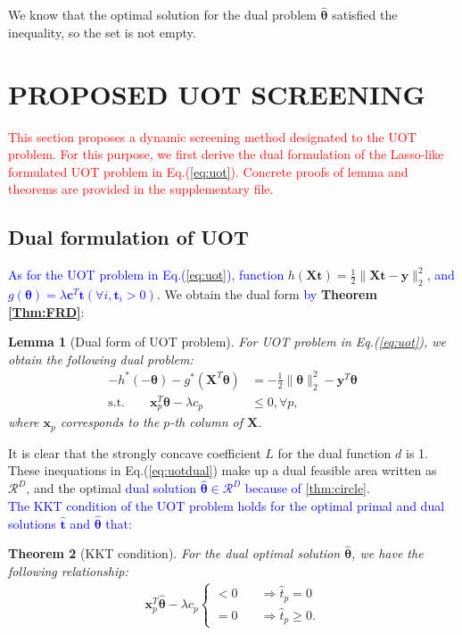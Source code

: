\documentclass[twoside]{article}
\theoremstyle{plain}
\newtheorem{thm}{Theorem}
\newtheorem{lem}[thm]{Lemma}
\newcommand{\tranT}{T}
\newcommand{\mat}[1]{\mathbf{#1}}
\renewcommand{\vec}[1]{\bm{#1}}
\newcommand{\changeHK}[1]{\textcolor{red}{#1}}
\newcommand{\changeXS}[1]{\textcolor{blue}{#1}}
\begin{document}
We know that the optimal solution for the dual problem $\hat{\vec{\theta}}$ satisfied the inequality, so the set is not empty.


\section{PROPOSED UOT SCREENING}
\label{sec:pro}

\changeHK{This section proposes a dynamic screening method designated to the UOT problem. For this purpose, we first derive the dual formulation of the Lasso-like formulated UOT problem in Eq.(\ref{eq:uot}). Concrete proofs of lemma and theorems are provided in the supplementary file.}


\subsection{Dual formulation of UOT}

\changeXS{As for the UOT problem in Eq.(\ref{eq:uot}), function } 
 $h(\mat{X} \vec{t}) = \frac{1}{2}\|\mat{X} \vec{t}-\vec{y}\|_2^2$, \changeXS{and $g(\vec{\theta})=\lambda \vec{c}^{T}\vec{t} ( \forall i, \vec{t}_i>0)$}. We obtain the dual form \changeXS{by} {\bf Theorem \ref{Thm:FRD}}:
\begin{lem}[Dual form of UOT problem]
For UOT problem in Eq.(\ref{eq:uot}), we obtain the following dual problem:
\begin{equation}
\begin{split}
-h^*(-\vec{\theta}) - g^*(\mat{X}^{\tranT}\vec{\theta})& = -\frac{1}{2}\|\vec{\theta}\|_2^2-\vec{y}^{\tranT}\vec{\theta} \\
 \text{s.t.} \quad \quad \vec{x}_p^{\tranT}\vec{\theta} -\lambda c_p &\leq 0, \forall p,
 \end{split}
 \label{eq:uotdual}
\end{equation}
where $\vec{x}_p $ corresponds to the $p$-th column of $\mat{X}$. 
\end{lem}
It is clear that the strongly concave coefficient $L$ for the dual function $d$ is 1. These inequations in Eq.(\ref{eq:uotdual}) make up a dual feasible area written as $\mathcal{R}^{D}$, and the optimal \changeXS{dual solution $\hat{\vec{\theta}} \in \mathcal{R}^{D}$ because of \ref{thm:circle}.}\\
\changeXS{The KKT condition of the UOT problem holds for the optimal primal and dual solutions $ \hat{\vec{t}}$ and $\hat{\vec{\theta}}$ that:}
\begin{thm}[KKT condition] For the dual optimal solution $\hat{\vec{\theta}}$, we have the following relationship:
 \begin{equation}
\begin{split}
\vec{x}_p^{\tranT}\hat{\vec{\theta}} -\lambda c_p \left\{
\begin{aligned}
< 0 \quad& \Rightarrow \hat{t}_p = 0\\
= 0 \quad& \Rightarrow \hat{t}_p \geq 0.
\end{aligned}
\right.
 \end{split}
 \label{eq:kkt}
\end{equation}
\end{thm}
\end{document}
